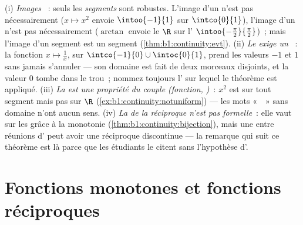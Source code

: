 \begin{remark}
(i) \emph{Images }~: seuls les \emph{segments} sont
robustes. L'image  d'un   n'est pas
nécessairement  ($x \mapsto x^2$ envoie $\intoo{-1}{1}$
sur $\intco{0}{1}$), l'image d'un  n'est pas nécessairement
 ($\arctan$ envoie le  $\R$ sur l'
$\intoo{-\frac\pi2}{\frac\pi2}$)~; mais l'image d'un segment est
un segment (\cref{thm:b1:continuity:evt}). (ii) \emph{Le
 exige un }~: la
fonction $x \mapsto \frac1x$,  sur $\intco{-1}{0} \cup
\intoc{0}{1}$, prend les valeurs $-1$ et $1$ sans jamais
s'annuler --- son domaine est fait de deux morceaux disjoints, et
la valeur $0$ tombe dans le trou~; nommez toujours l'
sur lequel le théorème est appliqué. (iii) \emph{La  est une propriété du couple (fonction, )}~:
$x^2$ est  sur tout segment mais pas sur
$\R$ (\cref{ex:b1:continuity:notuniform}) --- les mots
«~~» sans domaine n'ont aucun sens. (iv)
\emph{La  de la réciproque n'est pas formelle}~: elle
vaut sur les  grâce à la monotonie
(\cref{thm:b1:continuity:bijection}), mais une  
entre réunions d' peut avoir une réciproque
discontinue --- la remarque qui suit ce théorème est là parce que
les étudiants le citent sans l'hypothèse d'.
\end{remark}

\section{Fonctions monotones et fonctions réciproques}

